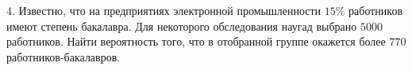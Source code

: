 \documentclass[12pt,a4paper]{article}
\begin{document}
	\noindent$4.$ Известно, что на предприятиях электронной промышленности
	$15\%$ работников имеют степень бакалавра.
	Для некоторого обследования наугад выбрано $5000$ работников.
	Найти вероятность того, что в отобранной группе окажется более
	$770$ работников-бакалавров.

  \begin{center}
  \end{center}
\end{document}
